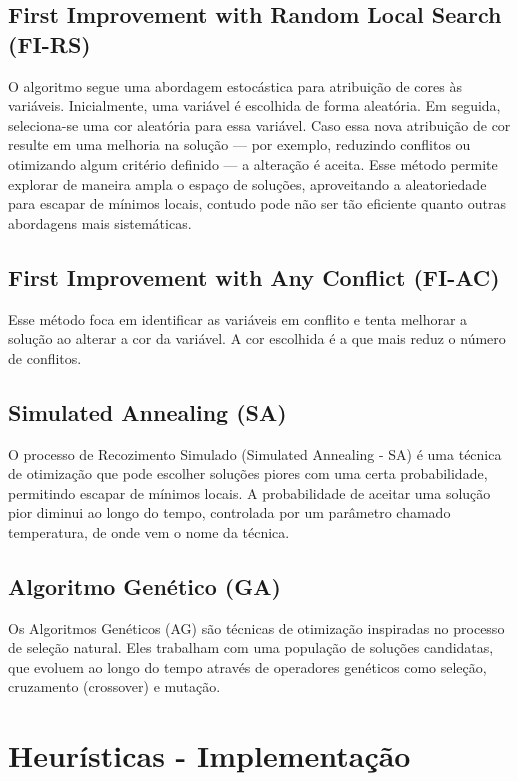 \documentclass[12pt,a4paper]{article}
\begin{document}
\subsection{First Improvement with Random Local Search (FI-RS)}

O algoritmo segue uma abordagem estocástica para atribuição de cores às variáveis. Inicialmente, uma variável é escolhida de forma aleatória. Em seguida, seleciona-se uma cor aleatória para essa variável. Caso essa nova atribuição de cor resulte em uma melhoria na solução — por exemplo, reduzindo conflitos ou otimizando algum critério definido — a alteração é aceita. Esse método permite explorar de maneira ampla o espaço de soluções, aproveitando a aleatoriedade para escapar de mínimos locais, contudo pode não ser tão eficiente quanto outras abordagens mais sistemáticas.

\subsection{First Improvement with Any Conflict (FI-AC)}

Esse método foca em identificar as variáveis em conflito e tenta melhorar a solução ao alterar a cor da variável. A cor escolhida é a que mais reduz o número de conflitos.

\subsection{Simulated Annealing (SA)}

O processo de Recozimento Simulado (Simulated Annealing - SA) é uma técnica de otimização que pode escolher soluções piores com uma certa probabilidade, permitindo escapar de mínimos locais. A probabilidade de aceitar uma solução pior diminui ao longo do tempo, controlada por um parâmetro chamado temperatura, de onde vem o nome da técnica.

\subsection{Algoritmo Genético (GA)}

Os Algoritmos Genéticos (AG) são técnicas de otimização inspiradas no processo de seleção natural. Eles trabalham com uma população de soluções candidatas, que evoluem ao longo do tempo através de operadores genéticos como seleção, cruzamento (crossover) e mutação.

\section{Heurísticas - Implementação}
\end{document}
